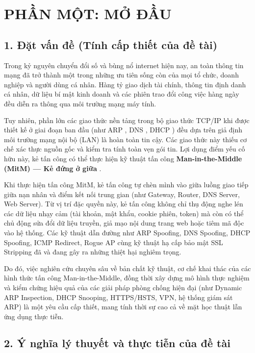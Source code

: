 \chapter*{PHẦN MỘT: MỞ ĐẦU}

\section*{1. Đặt vấn đề (Tính cấp thiết của đề tài)}

Trong kỷ nguyên chuyển đổi số và bùng nổ internet hiện nay, an toàn thông tin mạng đã trở thành một trong những ưu tiên sống còn của mọi tổ chức, doanh nghiệp và người dùng cá nhân. Hàng tỷ giao dịch tài chính, thông tin định danh cá nhân, dữ liệu bí mật kinh doanh và các phiên trao đổi công việc hàng ngày đều diễn ra thông qua môi trường mạng máy tính.

Tuy nhiên, phần lớn các giao thức nền tảng trong bộ giao thức TCP/IP khi được thiết kế ở giai đoạn ban đầu (như ARP \cite{rfc826_arp}, DNS \cite{rfc1035_dns}, DHCP \cite{rfc2131_dhcp}) đều dựa trên giả định môi trường mạng nội bộ (LAN) là hoàn toàn tin cậy. Các giao thức này thiếu cơ chế xác thực nguồn gốc và kiểm tra tính toàn vẹn gói tin. Lợi dụng điểm yếu cố hữu này, kẻ tấn công có thể thực hiện kỹ thuật tấn công \textbf{Man-in-the-Middle (MitM) --- Kẻ đứng ở giữa} \cite{callegati2009mitm}.

Khi thực hiện tấn công MitM, kẻ tấn công tự chèn mình vào giữa luồng giao tiếp giữa nạn nhân và điểm kết nối trung gian (như Gateway, Router, DNS Server, Web Server). Từ vị trí đặc quyền này, kẻ tấn công không chỉ thụ động nghe lén các dữ liệu nhạy cảm (tài khoản, mật khẩu, cookie phiên, token) mà còn có thể chủ động sửa đổi dữ liệu truyền, giả mạo nội dung trang web hoặc tiêm mã độc vào hệ thống. Các kỹ thuật dẫn đường như ARP Spoofing, DNS Spoofing, DHCP Spoofing, ICMP Redirect, Rogue AP cùng kỹ thuật hạ cấp bảo mật SSL Stripping \cite{marlinspike2009sslstrip} đã và đang gây ra những thiệt hại nghiêm trọng.

Do đó, việc nghiên cứu chuyên sâu về bản chất kỹ thuật, cơ chế khai thác của các hình thức tấn công Man-in-the-Middle, đồng thời xây dựng mô hình thực nghiệm và kiểm chứng hiệu quả của các giải pháp phòng chống hiện đại (như Dynamic ARP Inspection, DHCP Snooping, HTTPS/HSTS, VPN, hệ thống giám sát ARP) là một yêu cầu cấp thiết, mang tính thời sự cao cả về mặt học thuật lẫn ứng dụng thực tiễn.

\section*{2. Ý nghĩa lý thuyết và thực tiễn của đề tài}

